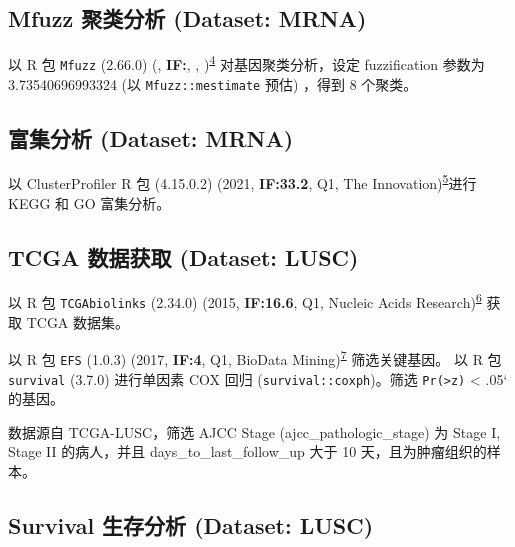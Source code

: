 \documentclass[
]{article}
\begin{document}
\hypertarget{mfuzz-ux805aux7c7bux5206ux6790-dataset-mrna}{%
\subsection{Mfuzz 聚类分析 (Dataset: MRNA)}\label{mfuzz-ux805aux7c7bux5206ux6790-dataset-mrna}}

以 R 包 \texttt{Mfuzz} (2.66.0) (, \textbf{IF:}, , )\textsuperscript{\protect\hyperlink{ref-Mfuzz_a_softwa_Kumar_2007}{4}} 对基因聚类分析，设定 fuzzification 参数为 3.73540696993324 (以 \texttt{Mfuzz::mestimate} 预估) ，得到 8 个聚类。

\hypertarget{ux5bccux96c6ux5206ux6790-dataset-mrna}{%
\subsection{富集分析 (Dataset: MRNA)}\label{ux5bccux96c6ux5206ux6790-dataset-mrna}}

以 ClusterProfiler R 包 (4.15.0.2) (2021, \textbf{IF:33.2}, Q1, The Innovation)\textsuperscript{\protect\hyperlink{ref-ClusterprofilerWuTi2021}{5}}进行 KEGG 和 GO 富集分析。

\hypertarget{tcga-ux6570ux636eux83b7ux53d6-dataset-lusc}{%
\subsection{TCGA 数据获取 (Dataset: LUSC)}\label{tcga-ux6570ux636eux83b7ux53d6-dataset-lusc}}

以 R 包 \texttt{TCGAbiolinks} (2.34.0) (2015, \textbf{IF:16.6}, Q1, Nucleic Acids Research)\textsuperscript{\protect\hyperlink{ref-TcgabiolinksAColapr2015}{6}} 获取 TCGA 数据集。

以 R 包 \texttt{EFS} (1.0.3) (2017, \textbf{IF:4}, Q1, BioData Mining)\textsuperscript{\protect\hyperlink{ref-EfsAnEnsemblNeuman2017}{7}} 筛选关键基因。
以 R 包 \texttt{survival} (3.7.0) 进行单因素 COX 回归 (\texttt{survival::coxph})。筛选 \texttt{Pr(\textgreater{}\textbar{}z\textbar{})} \textless{} .05` 的基因。

数据源自 TCGA-LUSC，筛选 AJCC Stage (ajcc\_pathologic\_stage) 为 Stage I, Stage II 的病人，并且 days\_to\_last\_follow\_up 大于 10 天，且为肿瘤组织的样本。

\hypertarget{survival-ux751fux5b58ux5206ux6790-dataset-lusc}{%
\subsection{Survival 生存分析 (Dataset: LUSC)}\label{survival-ux751fux5b58ux5206ux6790-dataset-lusc}}
\end{document}

